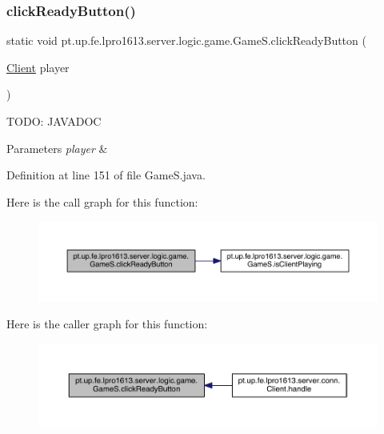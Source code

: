 \subsubsection{\texorpdfstring{click\+Ready\+Button()}{clickReadyButton()}}
{\footnotesize\ttfamily static void pt.\+up.\+fe.\+lpro1613.\+server.\+logic.\+game.\+Game\+S.\+click\+Ready\+Button (\begin{DoxyParamCaption}\item[{\hyperlink{classpt_1_1up_1_1fe_1_1lpro1613_1_1server_1_1conn_1_1_client}{Client}}]{player }\end{DoxyParamCaption})\hspace{0.3cm}{\ttfamily [static]}}

T\+O\+DO\+: J\+A\+V\+A\+D\+OC 
\begin{DoxyParams}{Parameters}
{\em player} & \\
\hline
\end{DoxyParams}


Definition at line 151 of file Game\+S.\+java.

Here is the call graph for this function\+:
\nopagebreak
\begin{figure}[H]
\begin{center}
\leavevmode
\includegraphics[width=350pt]{classpt_1_1up_1_1fe_1_1lpro1613_1_1server_1_1logic_1_1game_1_1_game_s_a86e47ee40e26d36abfdac5847e423a35_cgraph}
\end{center}
\end{figure}
Here is the caller graph for this function\+:
\nopagebreak
\begin{figure}[H]
\begin{center}
\leavevmode
\includegraphics[width=350pt]{classpt_1_1up_1_1fe_1_1lpro1613_1_1server_1_1logic_1_1game_1_1_game_s_a86e47ee40e26d36abfdac5847e423a35_icgraph}
\end{center}
\end{figure}
\hypertarget{classpt_1_1up_1_1fe_1_1lpro1613_1_1server_1_1logic_1_1game_1_1_game_s_aed1d2b65cf8abf9429c7613fb270140c}{}\label{classpt_1_1up_1_1fe_1_1lpro1613_1_1server_1_1logic_1_1game_1_1_game_s_aed1d2b65cf8abf9429c7613fb270140c} 
